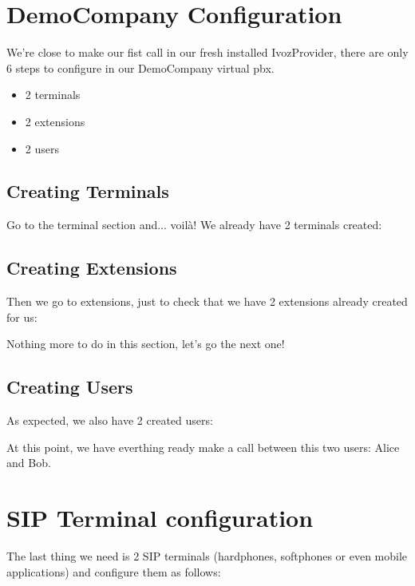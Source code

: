 \documentclass[letterpaper,10pt,english]{sphinxmanual}
\begin{document}
\section{DemoCompany Configuration}
\label{getting_started/internal_calls/company_portal::doc}\label{getting_started/internal_calls/company_portal:democompany-configuration}
We're close to make our fist call in our fresh installed IvozProvider, there
are only 6 steps to configure in our DemoCompany virtual pbx.
\begin{itemize}
\item {} 
2 terminals

\item {} 
2 extensions

\item {} 
2 users

\end{itemize}


\subsection{Creating Terminals}
\label{getting_started/internal_calls/company_portal:creating-terminals}
Go to the terminal section and... voilà! We already have 2 terminals created:

\noindent{}


\subsection{Creating Extensions}
\label{getting_started/internal_calls/company_portal:creating-extensions}
Then we go to extensions, just to check that we have 2 extensions already
created for us:

\noindent{}

Nothing more to do in this section, let's go the next one!


\subsection{Creating Users}
\label{getting_started/internal_calls/company_portal:creating-users}
As expected, we also have 2 created users:

\noindent{}

At this point, we have everthing ready make a call between this two users:
Alice and Bob.


\section{SIP Terminal configuration}
\label{getting_started/internal_calls/configure_sipuacs:sip-terminal-configuration}\label{getting_started/internal_calls/configure_sipuacs::doc}
The last thing we need is 2 SIP terminals (hardphones, softphones or even
mobile applications) and configure them as follows:
\end{document}
